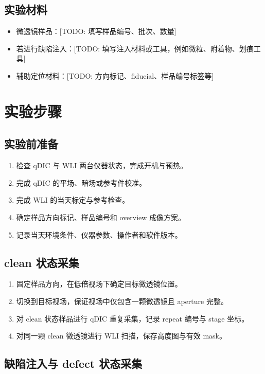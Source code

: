 \documentclass[UTF8,a4paper,11pt]{ctexart}
\newcommand{\TODO}[1]{\textcolor{red!70!black}{[TODO: #1]}}
\begin{document}
\subsection{实验材料}

\begin{itemize}
  \item 微透镜样品：\TODO{填写样品编号、批次、数量}
  \item 若进行缺陷注入：\TODO{填写注入材料或工具，例如微粒、附着物、划痕工具}
  \item 辅助定位材料：\TODO{方向标记、fiducial、样品编号标签等}
\end{itemize}

\section{实验步骤}

\subsection{实验前准备}

\begin{enumerate}
  \item 检查 qDIC 与 WLI 两台仪器状态，完成开机与预热。
  \item 完成 qDIC 的平场、暗场或参考件校准。
  \item 完成 WLI 的当天标定与参考检查。
  \item 确定样品方向标记、样品编号和 overview 成像方案。
  \item 记录当天环境条件、仪器参数、操作者和软件版本。
\end{enumerate}

\subsection{clean 状态采集}

\begin{enumerate}
  \item 固定样品方向，在低倍视场下确定目标微透镜位置。
  \item 切换到目标视场，保证视场中仅包含一颗微透镜且 aperture 完整。
  \item 对 clean 状态样品进行 qDIC 重复采集，记录 repeat 编号与 stage 坐标。
  \item 对同一颗 clean 微透镜进行 WLI 扫描，保存高度图与有效 mask。
\end{enumerate}

\subsection{缺陷注入与 defect 状态采集}
\end{document}
